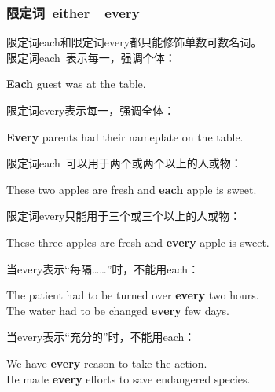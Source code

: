 \documentclass[UTF8]{ctexart}
\newcommand{\littf}[1]{{\hspace{3pt}\ttfamily #1}}
\begin{document}
\subsubsection{限定词~\littf{either}~~\littf{every}}
    限定词\littf{each}和限定词\littf{every}都只能修饰单数可数名词。\\[3mm]
    限定词\littf{each~}表示每一，强调个体：
    \begin{center}
        \large\ttfamily
        \textbf{Each} guest was at the table.\\[4mm]
    \end{center}
    限定词\littf{every}表示每一，强调全体：
    \begin{center}
        \large\ttfamily
        \textbf{Every} parents had their nameplate on the table.\\[4mm]
    \end{center}
    限定词\littf{each~}可以用于两个或两个以上的人或物：
    \begin{center}
        \large\ttfamily
        These two apples are fresh and \textbf{each} apple is sweet.\\[4mm]
    \end{center}
    限定词\littf{every}只能用于三个或三个以上的人或物：
    \begin{center}
        \large\ttfamily
        These three apples are fresh and \textbf{every} apple is sweet.\\[4mm]
    \end{center}
    当\littf{every}表示“每隔……”时，不能用\littf{each}：
    \begin{center}
        \large\ttfamily
        The patient had to be turned over \textbf{every} two hours.\\[2mm]
        The water had to be changed \textbf{every} few days.\\[4mm]
    \end{center}
    当\littf{every}表示“充分的”时，不能用\littf{each}：
    \begin{center}
        \large\ttfamily
        We have \textbf{every} reason to take the action.\\[2mm]
        He made \textbf{every} efforts to save endangered species.
    \end{center}

\newpage
\end{document}
